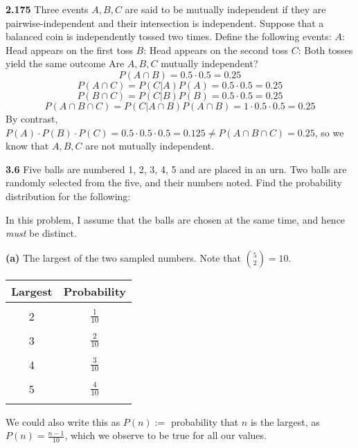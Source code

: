 \documentclass{exam}
\begin{document}
\begin{questions}
\newpage
\textbf{2.175 }
Three events $A, B, C$ are said to be mutually independent if they are pairwise-independent and their intersection is independent. Suppose that a balanced coin is independently tossed two times. Define the following events:
\newline
$A$: Head appears on the first toss
$B$: Head appears on the second toss
$C$: Both tosses yield the same outcome
\newline
Are $A, B, C$ mutually independent?
\sol
$$P(A \cap B) = 0.5 \cdot 0.5 = 0.25$$
$$P(A \cap C) = P(C | A)P(A) = 0.5 \cdot 0.5 = 0.25$$
$$P(B \cap C) = P(C | B)P(B) = 0.5 \cdot 0.5 = 0.25$$
$$P(A \cap B \cap C) = P(C | A \cap B)P(A \cap B) = 1 \cdot 0.5 \cdot 0.5 = 0.25$$
By contrast, $P(A) \cdot P(B) \cdot P(C) = 0.5 \cdot 0.5 \cdot 0.5 = 0.125 \neq P(A \cap B \cap C) = 0.25$, so we know that $A, B, C$ are not mutually independent.

\newpage
\textbf{3.6 }
Five balls are numbered 1, 2, 3, 4, 5 and are placed in an urn. Two balls are randomly selected from the five, and their numbers noted. Find the probability distribution for the following:

\newline
In this problem, I assume that the balls are chosen at the same time, and hence \textit{must} be distinct.

\textbf{(a) } The largest of the two sampled numbers.
\sol
Note that $\binom{5}{2} = 10$.

\newline

\begin{tabular}{|c|c|}
    Largest & Probability \\
    \hline
    & \\
     2 & $\frac{1}{10}$ \\
     & \\ %
     3 & $\frac{2}{10}$ \\
     & \\
     4 & $\frac{3}{10}$ \\
     & \\
     5 & $\frac{4}{10}$ \\
     & \\
     \hline
\end{tabular}

\newline

We could also write this as $P(n) := $ probability that $n$ is the largest, as
$P(n) = \frac{n - 1}{10}$, which we observe to be true for all our values.


\end{questions}
\end{document}
